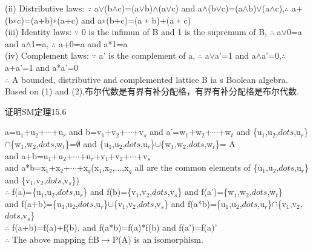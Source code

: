 \documentclass[11pt, a4paper, UTF8]{ctexart}
\begin{document}
\begin{solution}
(ii) Distributive laws: $\because$ a$\vee$(b$\wedge$c)=(a$\vee$b)$\wedge$(a$\vee$c) and a$\wedge$(b$\vee$c)=(a$\wedge$b)$\vee$(a$\wedge$c),$\therefore$ a+(b∗c)=(a+b)∗(a+c) and a∗(b+c)=(a ∗ b)+(a ∗ c)\\
(iii) Identity laws: $\because$ 0 is the infimun of B and 1 is the supremum of B, $\therefore$ a$\vee$0=a and a$\wedge$1=a, $\therefore$ a+0=a and a*1=a\\
(iv) Complement laws: $\because$ a' is the complement of a, $\therefore$ a$\vee$a'=1 and a$\wedge$a'=0,$\therefore$ a+a'=1 and a*a'=0\\
$\therefore$ A bounded, distributive and complemented lattice B ia s Boolean algebra.\\
Based on (1) and (2),布尔代数是有界有补分配格，有界有补分配格是布尔代数.
\end{solution}

\begin{problem}[第二题]
证明SM定理15.6
\end{problem}
\begin{solution}
a=u$_1$+u$_2$+$\cdots$+u$_r$ and b=v$_1$+v$_2$+$\cdots$+v$_s$ and a'=w$_1$+w$_2$+$\cdots$+w$_t$ and \{u$_1$,u$_2$,$dots$,u$_r$\}$\cap$\{w$_1$,w$_2$,$dots$,w$_t$\}=$\emptyset$ and \{u$_1$,u$_2$,$dots$,u$_r$\}$\cup$\{w$_1$,w$_2$,$dots$,w$_t$\}= A \\
and a+b=u$_1$+u$_2$+$\cdots$+u$_r$+v$_1$+v$_2$+$\cdots$+v$_s$\\
and a*b=x$_1$+x$_2$+$\cdots$+x$_q$(x$_1$,x$_2$,$\dots$,x$_q$ all are the common elements of \{u$_1$,u$_2$,$dots$,u$_r$\} and \{v$_1$,v$_2$,$dots$,v$_s$\})\\
$\therefore$ f(a)=\{u$_1$,u$_2$,$dots$,u$_r$\} and f(b)=\{v$_1$,v$_2$,$dots$,v$_s$\} and f(a')=\{w$_1$,w$_2$,$dots$,w$_t$\}\\
and f(a+b)=\{u$_1$,u$_2$,$dots$,u$_r$\}$\cup$\{v$_1$,v$_2$,$dots$,v$_s$\} and f(a*b)=\{u$_1$,u$_2$,$dots$,u$_r$\}$\cap$\{v$_1$,v$_2$,$dots$,v$_s$\}\\
$\therefore$ f(a+b)=f(a)+f(b), and f(a*b)=f(a)*f(b) and f(a')=f(a)’\\
$\therefore$ The above mapping f:B$\rightarrow$P(A) is an isomorphism.
\end{solution}
\end{document}
